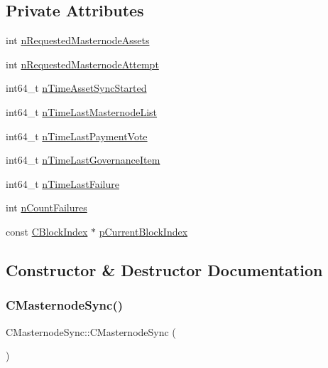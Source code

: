 \subsection*{Private Attributes}
\begin{DoxyCompactItemize}
\item 
int \mbox{\hyperlink{class_c_masternode_sync_abeae7e176fb73625e7063637198fbd1e}{n\+Requested\+Masternode\+Assets}}
\item 
int \mbox{\hyperlink{class_c_masternode_sync_ac04521e8296f3ac17522a974e51ae372}{n\+Requested\+Masternode\+Attempt}}
\item 
int64\+\_\+t \mbox{\hyperlink{class_c_masternode_sync_a73b90925df4d3e5e5c4a835b9f66d395}{n\+Time\+Asset\+Sync\+Started}}
\item 
int64\+\_\+t \mbox{\hyperlink{class_c_masternode_sync_ae56e7e83b732bb253fb2ae36a78673c9}{n\+Time\+Last\+Masternode\+List}}
\item 
int64\+\_\+t \mbox{\hyperlink{class_c_masternode_sync_a40f5c532b874fdc0e88497c28562c03e}{n\+Time\+Last\+Payment\+Vote}}
\item 
int64\+\_\+t \mbox{\hyperlink{class_c_masternode_sync_a132b4362365f9a721acfb93040b09af8}{n\+Time\+Last\+Governance\+Item}}
\item 
int64\+\_\+t \mbox{\hyperlink{class_c_masternode_sync_a7be6c57346924242435b0edbdb8da1b0}{n\+Time\+Last\+Failure}}
\item 
int \mbox{\hyperlink{class_c_masternode_sync_ae7bd255bf24c027baadd4c653695ea6b}{n\+Count\+Failures}}
\item 
const \mbox{\hyperlink{class_c_block_index}{C\+Block\+Index}} $\ast$ \mbox{\hyperlink{class_c_masternode_sync_aec044ce461d065cf9eab5677a5ba8fae}{p\+Current\+Block\+Index}}
\end{DoxyCompactItemize}


\subsection{Constructor \& Destructor Documentation}
\mbox{\label{class_c_masternode_sync_aca4714d280b60a9c242d66d055704b43}} 
\subsubsection{\texorpdfstring{C\+Masternode\+Sync()}{CMasternodeSync()}}
{\footnotesize\ttfamily C\+Masternode\+Sync\+::\+C\+Masternode\+Sync (\begin{DoxyParamCaption}{ }\end{DoxyParamCaption})\hspace{0.3cm}{\ttfamily [inline]}}



